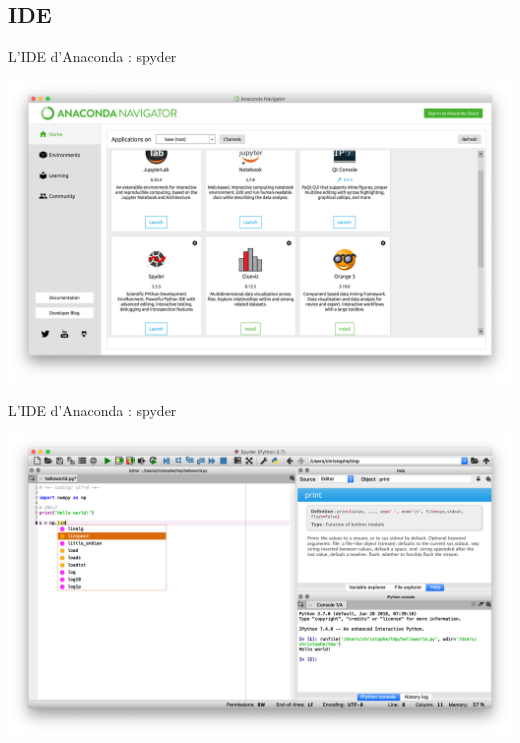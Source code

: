 \documentclass[10pt,aspectratio=169]{beamer}
\begin{document}
\subsection{IDE}

\begin{frame}{L'IDE d'Anaconda : spyder}
  \begin{center}
    \includegraphics[height = .8\textheight]{anaconda-navigator-spyder-launch}
  \end{center}
\end{frame}

\begin{frame}{L'IDE d'Anaconda : spyder}
  \begin{center}
    \includegraphics[height = .8\textheight]{spyder-help-completion}
  \end{center}
\end{frame}
\end{document}
